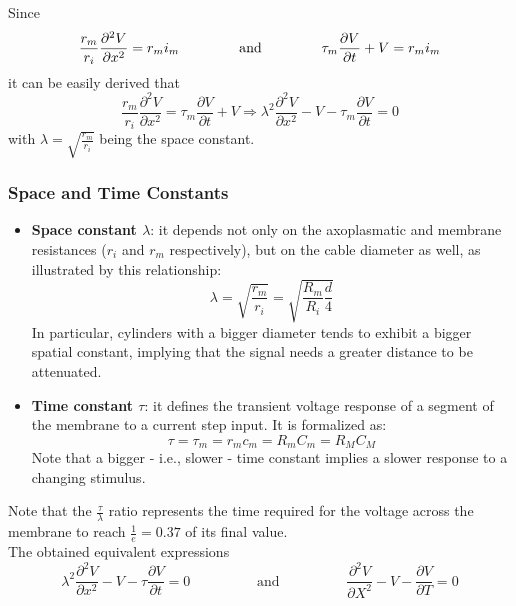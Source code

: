 Since
\begin{equation*}
    \frac{r_{m}}{r_{i}}\frac{\partial^{2}V}{\partial{x^{2}}}=r_{m}i_{m}
    \hspace{1.5cm}
    \text{and}
    \hspace{1.5cm}
    \tau_{m}\frac{\partial{V}}{\partial{t}}+V=r_{m}i_{m}
\end{equation*}
it can be easily derived that
\begin{equation*}
    \frac{r_{m}}{r_{i}}\frac{\partial^{2}V}{\partial{x^{2}}}
    =
    \tau_{m}\frac{\partial{V}}{\partial{t}}+V
    \Rightarrow
    \lambda^{2}\frac{\partial^{2}V}{\partial{x^{2}}}-V-\tau_{m}\frac{\partial{V}}{\partial{t}}
    =
    0
\end{equation*}
with \(\lambda=\sqrt{\frac{r_{m}}{r_{i}}}\) being the space constant.
\subsubsection{Space and Time Constants}
\begin{itemize}
    \item \textbf{Space constant \(\lambda\)}: it depends not only on the axoplasmatic
          and membrane resistances (\(r_{i}\) and \(r_{m}\) respectively), but on the cable
          diameter as well, as illustrated by this relationship:
          \begin{equation*}
              \lambda=\sqrt{\frac{r_{m}}{r_{i}}}=\sqrt{\frac{R_{m}}{R_{i}}\frac{d}{4}}
          \end{equation*}
          In particular, cylinders with a bigger diameter tends to exhibit a bigger
          spatial constant, implying that the signal needs a greater distance to be attenuated.
    \item \textbf{Time constant \(\tau\)}: it defines the transient voltage response
          of a segment of the membrane to a current step input. It is formalized as:
          \begin{equation*}
              \tau=\tau_{m}=r_{m}c_{m}=R_{m}C_{m}=R_{M}C_{M}
          \end{equation*}
          Note that a bigger - i.e., slower - time constant implies a slower response to a
          changing stimulus.
\end{itemize}
Note that the \(\frac{\tau}{\lambda}\) ratio represents the time required for the voltage
across the membrane to reach \(\frac{1}{e}=0.37\) of its final value.\\
The obtained equivalent expressions
\begin{equation*}
    \lambda^{2}\frac{\partial^{2}{V}}{\partial{x^{2}}}-V-\tau\frac{\partial{V}}{\partial{t}}=0
    \hspace{2cm}
    \text{and}
    \hspace{2cm}
    \frac{\partial^{2}{V}}{\partial{X^{2}}}-V-\frac{\partial{V}}{\partial{T}}=0
\end{equation*}
